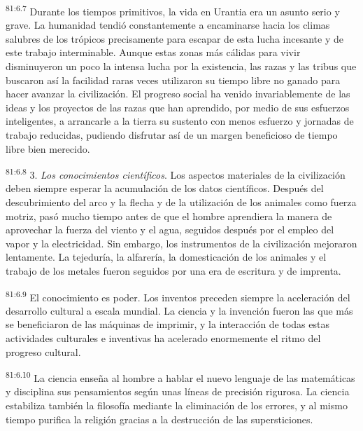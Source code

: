 \documentclass[twoside, 11pt]{book}
\begin{document}
\par
\textsuperscript{81:6.7} Durante los tiempos primitivos, la vida en Urantia era un asunto serio y grave. La humanidad tendió constantemente a encaminarse hacia los climas salubres de los trópicos precisamente para escapar de esta lucha incesante y de este trabajo interminable. Aunque estas zonas más cálidas para vivir disminuyeron un poco la intensa lucha por la existencia, las razas y las tribus que buscaron así la facilidad raras veces utilizaron su tiempo libre no ganado para hacer avanzar la civilización. El progreso social ha venido invariablemente de las ideas y los proyectos de las razas que han aprendido, por medio de sus esfuerzos inteligentes, a arrancarle a la tierra su sustento con menos esfuerzo y jornadas de trabajo reducidas, pudiendo disfrutar así de un margen beneficioso de tiempo libre bien merecido.

\par
\textsuperscript{81:6.8} 3. \textit{Los conocimientos científicos}. Los aspectos materiales de la civilización deben siempre esperar la acumulación de los datos científicos. Después del descubrimiento del arco y la flecha y de la utilización de los animales como fuerza motriz, pasó mucho tiempo antes de que el hombre aprendiera la manera de aprovechar la fuerza del viento y el agua, seguidos después por el empleo del vapor y la electricidad. Sin embargo, los instrumentos de la civilización mejoraron lentamente. La tejeduría, la alfarería, la domesticación de los animales y el trabajo de los metales fueron seguidos por una era de escritura y de imprenta.

\par
\textsuperscript{81:6.9} El conocimiento es poder. Los inventos preceden siempre la aceleración del desarrollo cultural a escala mundial. La ciencia y la invención fueron las que más se beneficiaron de las máquinas de imprimir, y la interacción de todas estas actividades culturales e inventivas ha acelerado enormemente el ritmo del progreso cultural.

\par
\textsuperscript{81:6.10} La ciencia enseña al hombre a hablar el nuevo lenguaje de las matemáticas y disciplina sus pensamientos según unas líneas de precisión rigurosa. La ciencia estabiliza también la filosofía mediante la eliminación de los errores, y al mismo tiempo purifica la religión gracias a la destrucción de las supersticiones.
\end{document}
